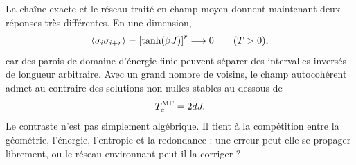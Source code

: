 La chaîne exacte et le réseau traité en champ moyen donnent maintenant deux réponses très différentes. En une dimension,
\begin{equation}
\left\langle\sigma_i\sigma_{i+r}\right\rangle
=\left[\tanh(\beta J)\right]^r
\longrightarrow0
\qquad (T>0),
\end{equation}
car des parois de domaine d’énergie finie peuvent séparer des intervalles inversés de longueur arbitraire. Avec un grand nombre de voisins, le champ autocohérent admet au contraire des solutions non nulles stables au-dessous de
\begin{equation}
T_c^{\rm MF}=2dJ.
\end{equation}
Le contraste n’est pas simplement algébrique. Il tient à la compétition entre la géométrie, l’énergie, l’entropie et la redondance : une erreur peut-elle se propager librement, ou le réseau environnant peut-il la corriger ?
